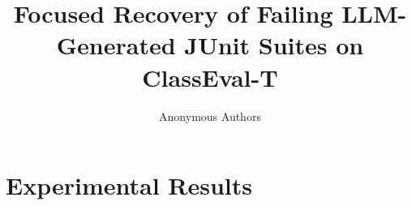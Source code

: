 \documentclass[conference]{IEEEtran}
\begin{document}
\title{Focused Recovery of Failing LLM-Generated JUnit Suites on ClassEval-T}

\author{Anonymous Authors}

\maketitle












\section{Experimental Results}
\label{sec:results}













\end{document}
